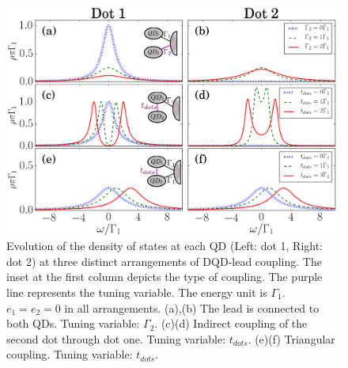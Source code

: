     \begin{figure}[t]
        \centering
         \includegraphics[scale=0.47]{IMAGES/DQD/Non-interacting.png}
         \caption{\label{fig:GreenDQD} Evolution of the density of states at each QD (Left: dot 1, Right: dot 2) at three distinct arrangements of DQD-lead coupling. The inset at the first column depicts the type of coupling. The purple line represents the tuning variable. The energy unit is $\Gamma_1$. $e_1 =e_2 =0$ in all arrangements. (a),(b) The lead is connected to both QDs. Tuning variable: $\Gamma_2$. (c)(d) Indirect coupling of the second dot through dot one. Tuning variable: $t_{dots}$. (e)(f) Triangular coupling. Tuning variable: $t_{dots}$.  
         \protect\Source{   }}
    \end{figure}



